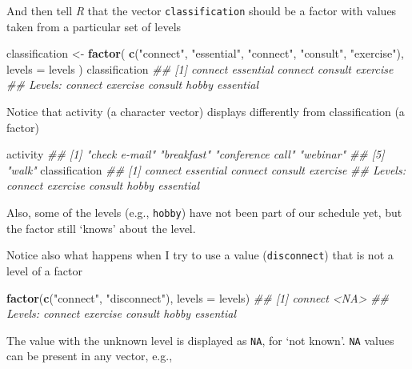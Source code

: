 \documentclass[]{book}
\newenvironment{Shaded}{\begin{snugshade}}{\end{snugshade}}
\newcommand{\CommentTok}[1]{\textcolor[rgb]{0.56,0.35,0.01}{\textit{#1}}}
\newcommand{\DataTypeTok}[1]{\textcolor[rgb]{0.13,0.29,0.53}{#1}}
\newcommand{\KeywordTok}[1]{\textcolor[rgb]{0.13,0.29,0.53}{\textbf{#1}}}
\newcommand{\NormalTok}[1]{#1}
\newcommand{\StringTok}[1]{\textcolor[rgb]{0.31,0.60,0.02}{#1}}
\begin{document}
And then tell \emph{R} that the vector \texttt{classification} should be a factor with values taken from a particular set of levels

\begin{Shaded}
\begin{Highlighting}[]
\NormalTok{classification <-}\StringTok{ }\KeywordTok{factor}\NormalTok{(}
    \KeywordTok{c}\NormalTok{(}\StringTok{"connect"}\NormalTok{, }\StringTok{"essential"}\NormalTok{, }\StringTok{"connect"}\NormalTok{, }\StringTok{"consult"}\NormalTok{, }\StringTok{"exercise"}\NormalTok{),}
    \DataTypeTok{levels =}\NormalTok{ levels}
\NormalTok{)}
\NormalTok{classification}
\CommentTok{## [1] connect   essential connect   consult   exercise }
\CommentTok{## Levels: connect exercise consult hobby essential}
\end{Highlighting}
\end{Shaded}

Notice that activity (a character vector) displays differently from classification (a factor)

\begin{Shaded}
\begin{Highlighting}[]
\NormalTok{activity}
\CommentTok{## [1] "check e-mail"    "breakfast"       "conference call" "webinar"        }
\CommentTok{## [5] "walk"}
\NormalTok{classification}
\CommentTok{## [1] connect   essential connect   consult   exercise }
\CommentTok{## Levels: connect exercise consult hobby essential}
\end{Highlighting}
\end{Shaded}

Also, some of the levels (e.g., \texttt{hobby}) have not been part of our schedule yet, but the factor still `knows' about the level.

Notice also what happens when I try to use a value (\texttt{disconnect}) that is not a level of a factor

\begin{Shaded}
\begin{Highlighting}[]
\KeywordTok{factor}\NormalTok{(}\KeywordTok{c}\NormalTok{(}\StringTok{"connect"}\NormalTok{, }\StringTok{"disconnect"}\NormalTok{), }\DataTypeTok{levels =}\NormalTok{ levels)}
\CommentTok{## [1] connect <NA>   }
\CommentTok{## Levels: connect exercise consult hobby essential}
\end{Highlighting}
\end{Shaded}

The value with the unknown level is displayed as \texttt{NA}, for `not known'. \texttt{NA} values can be present in any vector, e.g.,
\end{document}
